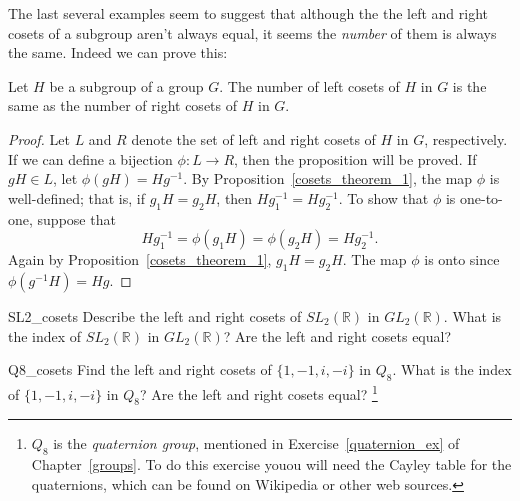 The last several examples seem to suggest that although the the left and right cosets of a subgroup aren't always equal, it seems the \emph{number} of them is always the same.  Indeed we can prove this:

\begin{thm}\label{cosets_theorem_3}
Let $H$ be a subgroup of a group $G$.  The number of left cosets of $H$ in $G$ is the same as the number of right cosets of $H$ in $G$.  
\end{thm}

 
\begin{proof}
Let $L$ and  $R$ denote the set of left and right cosets of $H$ in $G$, respectively.  If we can define a bijection $\phi :  L \rightarrow R$, then the proposition will be proved.  If $gH \in L$, let $\phi( gH ) = Hg^{-1}$.  By Proposition~\ref{cosets_theorem_1}, the map $\phi$ is well-defined; that is, if $g_1 H = g_2 H$, then $H g_1^{-1} = H g_2^{-1}$.  To show that $\phi$ is one-to-one, suppose that 
\[
H g_1^{-1} = \phi( g_1 H ) = \phi( g_2 H ) = H g_2^{-1}.
\]
Again by Proposition~\ref{cosets_theorem_1}, $g_1 H = g_2 H$.  The map $\phi$ is onto since $\phi(g^{-1} H ) = H g$. 
\hspace*{1in}
\end{proof}
 


\begin{exercise}{SL2_cosets}
Describe the left and right cosets of $SL_2( {\mathbb R} )$ in $GL_2( {\mathbb R})$.   What is the index of $SL_2( {\mathbb R} )$ in $GL_2( {\mathbb R})$? Are the left and right cosets equal?
\end{exercise}

\begin{exercise}{Q8_cosets}
Find the left and right cosets of $\{ 1, -1, i, -i \}$ in $Q_8$.  What is the index of $\{ 1, -1, i, -i \}$ in $Q_8$?  Are the left and right cosets equal? \footnote{$Q_8$ is the \emph{quaternion group}, mentioned in Exercise~\ref{quaternion_ex} of Chapter~\ref{groups}. To do this exercise youou will need the Cayley table for  the quaternions, which can be found on Wikipedia or other web sources.}
\end{exercise}

 
